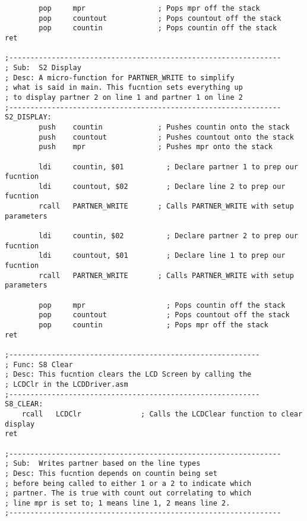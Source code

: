 \documentclass[12pt, letterpaper]{article}
\begin{document}
\begin{verbatim}
		pop		mpr                 ; Pops mpr off the stack
		pop		countout            ; Pops countout off the stack
		pop		countin             ; Pops countin off the stack
ret

;----------------------------------------------------------------
; Sub:	S2 Display
; Desc:	A micro-function for PARTNER_WRITE to simplify
; what is said in main. This fucntion sets everything up
; to display partner 2 on line 1 and partner 1 on line 2
;----------------------------------------------------------------
S2_DISPLAY:
		push	countin             ; Pushes countin onto the stack
		push	countout            ; Pushes countout onto the stack
		push	mpr                 ; Pushes mpr onto the stack

		ldi		countin, $01          ; Declare partner 1 to prep our fucntion
		ldi		countout, $02         ; Declare line 2 to prep our fucntion
		rcall	PARTNER_WRITE       ; Calls PARTNER_WRITE with setup parameters

		ldi		countin, $02          ; Declare partner 2 to prep our fucntion
		ldi		countout, $01         ; Declare line 1 to prep our fucntion
		rcall	PARTNER_WRITE       ; Calls PARTNER_WRITE with setup parameters

		pop		mpr                   ; Pops countin off the stack
		pop		countout              ; Pops countout off the stack
		pop		countin               ; Pops mpr off the stack
ret

;-----------------------------------------------------------
; Func: S8 Clear
; Desc: This fucntion clears the LCD Screen by calling the
; LCDClr in the LCDDriver.asm
;-----------------------------------------------------------
S8_CLEAR:
	rcall	LCDClr              ; Calls the LCDClear function to clear display	
ret

;----------------------------------------------------------------
; Sub:	Writes partner based on the line types
; Desc:	This fucntion depends on countin being set
; before being called to either 1 or a 2 to indicate which 
; partner. The is true with count out correlating to which
; line mpr is set to; 1 means line 1, 2 means line 2.
;----------------------------------------------------------------


\end{verbatim}
\end{document}

